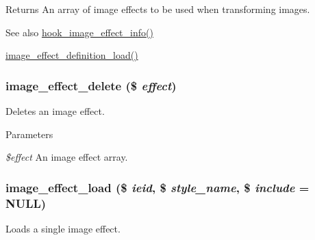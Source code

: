 \begin{DoxyReturn}{Returns}
An array of image effects to be used when transforming images. 
\end{DoxyReturn}
\begin{DoxySeeAlso}{See also}
\hyperlink{group__hooks_ga9681816aeb01a316e98457b40a01f8ed}{hook\_\-image\_\-effect\_\-info()} 

\hyperlink{image_8module_a91383fe83b2a2da4c90b4221e48abf6a}{image\_\-effect\_\-definition\_\-load()} 
\end{DoxySeeAlso}
\hypertarget{image_8module_abb2f70cfdb563527af8f05eb81aee202}{
\subsubsection[{image\_\-effect\_\-delete}]{\setlength{\rightskip}{0pt plus 5cm}image\_\-effect\_\-delete (\$ {\em effect})}}
\label{image_8module_abb2f70cfdb563527af8f05eb81aee202}
Deletes an image effect.


\begin{DoxyParams}{Parameters}
\item[{\em \$effect}]An image effect array. \end{DoxyParams}
\hypertarget{image_8module_a7ad62224057dbc7757dfa2df898926ad}{
\subsubsection[{image\_\-effect\_\-load}]{\setlength{\rightskip}{0pt plus 5cm}image\_\-effect\_\-load (\$ {\em ieid}, \/  \$ {\em style\_\-name}, \/  \$ {\em include} = {\ttfamily NULL})}}
\label{image_8module_a7ad62224057dbc7757dfa2df898926ad}
Loads a single image effect.



